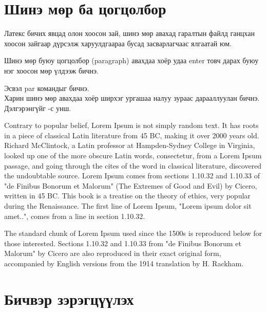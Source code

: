 \documentclass[12pt,A4]{report}
\begin{document}
\section{Шинэ мөр ба цогцолбор}
Латекс бичих явцад олон хоосон зай, шинэ мөр авахад гаралтын файлд ганцхан хоосон зайгаар дүрсэлж харуулдгаараа бусад засварлагчаас ялгаатай юм.

Шинэ мөр буюу цогцолбор (paragraph) авахдаа хоёр удаа enter товч дарах буюу нэг хоосон мөр үлдээж бичнэ. \par Эсвэл par командыг бичнэ.
\\Харин шинэ мөр авахдаа хоёр ширхэг ургашаа налуу зураас дарааллуулан бичнэ.  Дэлгэрэнгүйг \cite{pharagraph1}-с унш.

Contrary to popular belief, Lorem Ipsum is not simply random text. It has roots in a piece of classical Latin literature from 45 BC, making it over 2000 years old. Richard McClintock, a Latin professor at Hampden-Sydney College in Virginia, looked up one of the more obscure Latin words, consectetur, from a Lorem Ipsum passage, and going through the cites of the word in classical literature, discovered the undoubtable source. Lorem Ipsum comes from sections 1.10.32 and 1.10.33 of "de Finibus Bonorum et Malorum" (The Extremes of Good and Evil) by Cicero, written in 45 BC. This book is a treatise on the theory of ethics, very popular during the Renaissance. The first line of Lorem Ipsum, "Lorem ipsum dolor sit amet..", comes from a line in section 1.10.32.

The standard chunk of Lorem Ipsum used since the 1500s is reproduced below for those interested. Sections 1.10.32 and 1.10.33 from "de Finibus Bonorum et Malorum" by Cicero are also reproduced in their exact original form, accompanied by English versions from the 1914 translation by H. Rackham.

\section{Бичвэр зэрэгцүүлэх}
\end{document}
